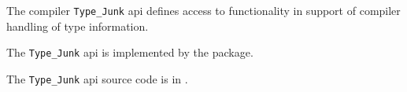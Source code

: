 
The compiler {\tt Type\_Junk} api defines access to functionality in 
support of compiler handling of type information.

The {\tt Type\_Junk} api is implemented by the  package.

The {\tt Type\_Junk} api source code is in .

